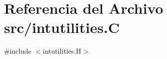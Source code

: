 \hypertarget{intutilities_8_c}{}\section{Referencia del Archivo src/intutilities.C}
\label{intutilities_8_c}
{\ttfamily \#include $<$intutilities.\+H$>$}\newline

